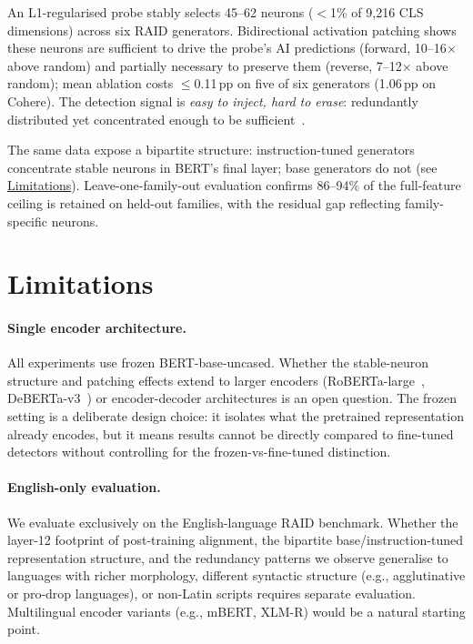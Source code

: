 \documentclass[11pt]{article}
\newcommand{\bertbase}{BERT-base-uncased\xspace}
\begin{document}
An L1-regularised probe stably selects 45--62 neurons ($<$1\% of 9{,}216 CLS dimensions) across six RAID generators. Bidirectional activation patching shows these neurons are sufficient to drive the probe's AI predictions (forward, 10--16$\times$ above random) and partially necessary to preserve them (reverse, 7--12$\times$ above random); mean ablation costs $\leq$0.11\,pp on five of six generators (1.06\,pp on Cohere). The detection signal is \textit{easy to inject, hard to erase}: redundantly distributed yet concentrated enough to be sufficient~\citep{dalvi2020redundancy}.

The same data expose a bipartite structure: instruction-tuned generators concentrate stable neurons in BERT's final layer; base generators do not (see \hyperref[sec:limitations]{Limitations}). Leave-one-family-out evaluation confirms 86--94\% of the full-feature ceiling is retained on held-out families, with the residual gap reflecting family-specific neurons.

\section*{Limitations}
\label{sec:limitations}

\paragraph{Single encoder architecture.}
All experiments use frozen \bertbase. Whether the stable-neuron structure and patching effects extend to larger encoders (RoBERTa-large~\citep{liu2019roberta}, DeBERTa-v3~\citep{he2021debertav3}) or encoder-decoder architectures is an open question. The frozen setting is a deliberate design choice: it isolates what the pretrained representation already encodes, but it means results cannot be directly compared to fine-tuned detectors without controlling for the frozen-vs-fine-tuned distinction.

\paragraph{English-only evaluation.}
We evaluate exclusively on the English-language RAID benchmark. Whether the layer-12 footprint of post-training alignment, the bipartite base/instruction-tuned representation structure, and the redundancy patterns we observe generalise to languages with richer morphology, different syntactic structure (e.g., agglutinative or pro-drop languages), or non-Latin scripts requires separate evaluation. Multilingual encoder variants (e.g., mBERT, XLM-R) would be a natural starting point.
\end{document}
